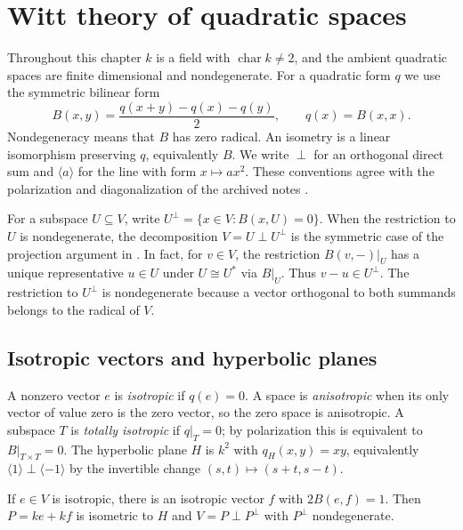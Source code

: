 \chapter{Witt theory of quadratic spaces}
\label{ch:la01-witt}

Throughout this chapter \(k\) is a field with
\(\operatorname{char} k\ne 2\), and the ambient quadratic spaces are
finite dimensional and nondegenerate. For a quadratic form \(q\) we
use the symmetric bilinear form
\[
  B(x,y)=\frac{q(x+y)-q(x)-q(y)}{2},
  \qquad q(x)=B(x,x).
\]
Nondegeneracy means that \(B\) has zero radical. An isometry is a
linear isomorphism preserving \(q\), equivalently \(B\). We write
\(\perp\) for an orthogonal direct sum and \(\langle a\rangle\) for
the line with form \(x\mapsto ax^2\). These conventions agree with
the polarization and diagonalization of the archived notes
\cite[11.polarization and 11.diagonal\_congruence]{d05}.

For a subspace \(U\subseteq V\), write
\(U^\perp=\{x\in V:B(x,U)=0\}\).
When the restriction to \(U\) is nondegenerate, the decomposition
\(V=U\perp U^\perp\) is the symmetric case of the projection argument
in \cite[11.nondegenerate]{d05}. In fact, for \(v\in V\), the
restriction \(B(v,-)|_U\) has a unique representative \(u\in U\)
under \(U\cong U^*\) via \(B|_U\). Thus \(v-u\in U^\perp\).
The restriction to \(U^\perp\) is nondegenerate because a vector
orthogonal to both summands belongs to the radical of \(V\).

\section{Isotropic vectors and hyperbolic planes}

A nonzero vector \(e\) is \emph{isotropic} if \(q(e)=0\).
A space is \emph{anisotropic} when its only vector of value zero is
the zero vector, so the zero space is anisotropic. A subspace \(T\)
is \emph{totally isotropic} if \(q|_T=0\); by polarization this is
equivalent to \(B|_{T\times T}=0\). The hyperbolic plane \(H\) is
\(k^2\) with \(q_H(x,y)=xy\), equivalently
\(\langle 1\rangle\perp\langle -1\rangle\) by the invertible
change \((s,t)\mapsto(s+t,s-t)\).

\begin{lemma}
\label{lem:la01-hyperbolic-splitting}
If \(e\in V\) is isotropic, there is an isotropic vector \(f\)
with \(2B(e,f)=1\). Then \(P=ke+kf\) is isometric to \(H\) and
\(V=P\perp P^\perp\) with \(P^\perp\) nondegenerate.
\end{lemma}

